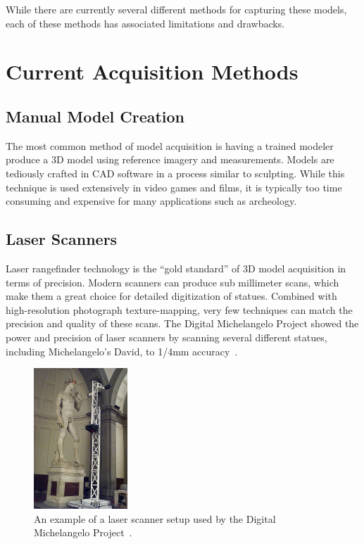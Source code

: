 While there are currently several different methods for capturing these models, each of these methods has associated limitations and drawbacks.


\section{Current Acquisition Methods}

\subsection{Manual Model Creation}
The most common method of model acquisition is having a trained modeler produce a 3D model using reference imagery and measurements. Models are tediously crafted in CAD software in a process similar to sculpting. While this technique is used extensively in video games and films, it is typically too time consuming and expensive for many applications such as archeology.

\subsection{Laser Scanners}
Laser rangefinder technology is the ``gold standard'' of 3D model acquisition in terms of precision. Modern scanners can produce sub millimeter scans, which make them a great choice for detailed digitization of statues. Combined with high-resolution photograph texture-mapping, very few techniques can match the precision and quality of these scans. The Digital Michelangelo Project showed the power and precision of laser scanners by scanning several different statues, including Michelangelo's David, to 1/4mm accuracy~\cite{Levoy}.

\begin{figure}
\centering
\includegraphics[height=200px]{../images/david_scan.jpg}
\caption{An example of a laser scanner setup used by the Digital Michelangelo Project~\cite{Levoy}.}
\end{figure}

